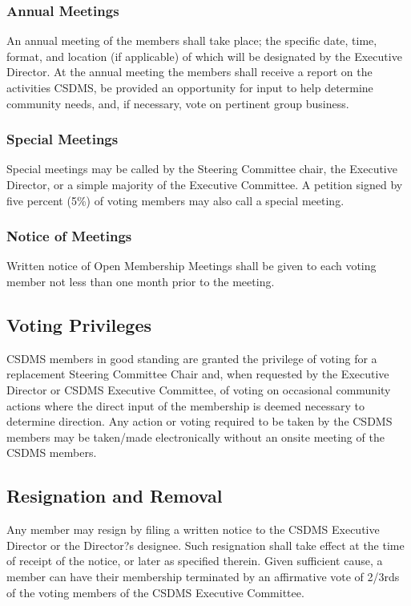 \documentclass[11pt, oneside]{article}   	%
\begin{document}
\subsubsection{Annual Meetings} 

An annual meeting of the members shall take place; the specific date, time, format, and location (if applicable) of which will be designated by the Executive Director.  At the annual meeting the members shall receive a report on the activities CSDMS, be provided an opportunity for input to help determine community needs, and, if necessary, vote on pertinent group business.

\subsubsection{Special Meetings} 

Special meetings may be called by the Steering Committee chair, the Executive Director, or a simple majority of the Executive Committee. A petition signed by five percent (5\%) of voting members may also call a special meeting.

\subsubsection{Notice of Meetings} 

Written notice of Open Membership Meetings shall be given to each voting member not less than one month prior to the meeting.


\subsection{Voting Privileges}

CSDMS members in good standing are granted the privilege of voting for a replacement Steering Committee Chair and, when requested by the Executive Director or CSDMS Executive Committee, of voting on occasional community actions where the direct input of the membership is deemed necessary to determine direction.  Any action or voting required to be taken by the CSDMS members may be taken/made electronically without an onsite meeting of the CSDMS members.


\subsection{Resignation and Removal}

Any member may resign by filing a written notice to the CSDMS Executive Director or the Director?s designee.  Such resignation shall take effect at the time of receipt of the notice, or later as specified therein. Given sufficient cause, a member can have their membership terminated by an affirmative vote of 2/3rds of the voting members of the CSDMS Executive Committee.
\end{document}
